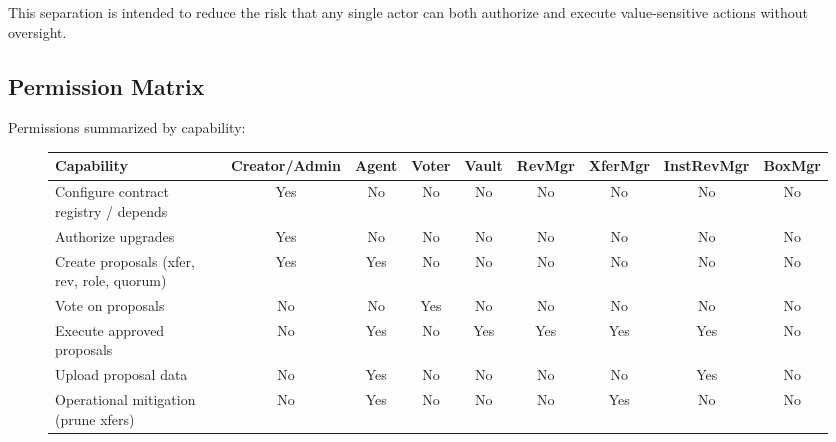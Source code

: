 \documentclass[10pt]{article}
\begin{document}
This separation is intended to reduce the risk that any single actor can both authorize and execute value-sensitive actions without oversight.

\subsection{Permission Matrix}

Permissions summarized by capability:

\begin{figure}[h!]
    \centering
    \small
    \setlength{\tabcolsep}{4pt}
    \renewcommand{\arraystretch}{1.2}
    \begin{tabularx}{\textwidth}{lcccccccc}
        \toprule
        \textbf{Capability}                        & \textbf{Creator/Admin} & \textbf{Agent} & \textbf{Voter} & \textbf{Vault} & \textbf{RevMgr} & \textbf{XferMgr} & \textbf{InstRevMgr} & \textbf{BoxMgr} \\
        \midrule
        Configure contract registry / depends      & Yes                    & No             & No             & No             & No              & No               & No                  & No              \\
        Authorize upgrades                         & Yes                    & No             & No             & No             & No              & No               & No                  & No              \\
        Create proposals (xfer, rev, role, quorum) & Yes                    & Yes            & No             & No             & No              & No               & No                  & No              \\
        Vote on proposals                          & No                     & No             & Yes            & No             & No              & No               & No                  & No              \\
        Execute approved proposals                 & No                     & Yes            & No             & Yes            & Yes             & Yes              & Yes                 & No              \\
        Upload proposal data                       & No                     & Yes            & No             & No             & No              & No               & Yes                 & No              \\
        Operational mitigation (prune xfers)       & No                     & Yes            & No             & No             & No              & Yes              & No                  & No              \\

\end{tabularx}
\end{figure}
\end{document}
